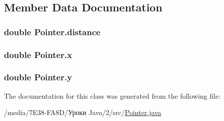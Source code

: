 \subsection{Member Data Documentation}
\hypertarget{class_pointer_a0cbed6a53ba239e3f499ed749ecef4f8}{
\subsubsection[{distance}]{\setlength{\rightskip}{0pt plus 5cm}double {\bf Pointer.distance}}}
\label{class_pointer_a0cbed6a53ba239e3f499ed749ecef4f8}
\hypertarget{class_pointer_a3355e2637f3fcf81237185750b93fb63}{
\subsubsection[{x}]{\setlength{\rightskip}{0pt plus 5cm}double {\bf Pointer.x}}}
\label{class_pointer_a3355e2637f3fcf81237185750b93fb63}
\hypertarget{class_pointer_ad40ec5fcc04894ee9e3b25d7059bf9db}{
\subsubsection[{y}]{\setlength{\rightskip}{0pt plus 5cm}double {\bf Pointer.y}}}
\label{class_pointer_ad40ec5fcc04894ee9e3b25d7059bf9db}


The documentation for this class was generated from the following file:\begin{DoxyCompactItemize}
\item 
/media/7E38-\/FA8D/Уроки Java/2/src/\hyperlink{_pointer_8java}{Pointer.java}\end{DoxyCompactItemize}
